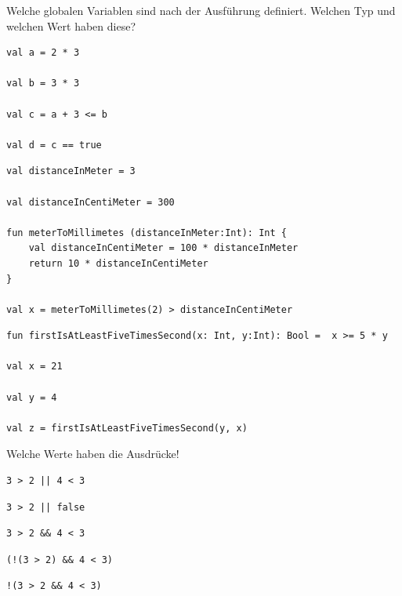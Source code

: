 \documentclass[DIV = 11]{scrartcl}
\begin{document}
\begin{aufgabe}
Welche globalen Variablen sind nach der Ausführung definiert. Welchen Typ und welchen Wert haben diese?

\begin{teilaufgaben}

\teilaufgabe \begin{verbatim}
val a = 2 * 3

val b = 3 * 3

val c = a + 3 <= b

val d = c == true
\end{verbatim}

\teilaufgabe \begin{verbatim}
val distanceInMeter = 3

val distanceInCentiMeter = 300

fun meterToMillimetes (distanceInMeter:Int): Int {
    val distanceInCentiMeter = 100 * distanceInMeter
    return 10 * distanceInCentiMeter 
}	

val x = meterToMillimetes(2) > distanceInCentiMeter 
\end{verbatim}

\teilaufgabe \begin{verbatim}
fun firstIsAtLeastFiveTimesSecond(x: Int, y:Int): Bool =  x >= 5 * y

val x = 21

val y = 4

val z = firstIsAtLeastFiveTimesSecond(y, x)
\end{verbatim}
\end{teilaufgaben}


\end{aufgabe}


\begin{aufgabe}
Welche Werte haben die Ausdrücke!
\begin{teilaufgaben}
\teilaufgabe \begin{verbatim}
3 > 2 || 4 < 3
\end{verbatim}

\teilaufgabe \begin{verbatim}
3 > 2 || false
\end{verbatim}

\teilaufgabe \begin{verbatim}
3 > 2 && 4 < 3
\end{verbatim}

\teilaufgabe \begin{verbatim}
(!(3 > 2) && 4 < 3)
\end{verbatim}

\teilaufgabe \begin{verbatim}
!(3 > 2 && 4 < 3)
\end{verbatim}

\end{teilaufgaben}
\end{aufgabe}
\end{document}

